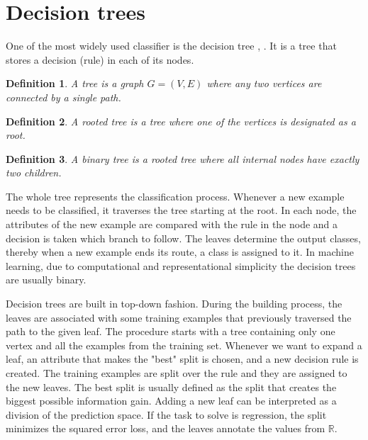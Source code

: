 \documentclass{pracamgr}
\newtheorem{mydef}{Definition}
\begin{document}
\section{Decision trees}
One of the most widely used classifier is the decision tree \citep{quinlan1986induction},
\citep{morgan:1963}.
It is a tree that stores a decision (rule) in each of its nodes.

\begin{mydef}
 A tree is a graph $G = (V, E)$ where any two vertices are connected by a single path.
\end{mydef}

\begin{mydef}
 A rooted tree is a tree where one of the vertices is designated as a root.
\end{mydef}

\begin{mydef}
 A binary tree is a rooted tree where all internal nodes have exactly two children.
\end{mydef}

The whole tree represents the classification
process. Whenever a new example needs to be classified, it traverses the tree starting at the
root. In each node, the attributes of the new example are compared with the rule in the node
and a decision is taken which branch to follow. The leaves determine the output classes, thereby
when a new example ends its route, a class is assigned to it. In machine learning,
due to computational and representational simplicity the decision trees are usually
binary.

Decision trees are built in top-down fashion. During the building process, the leaves are
associated with some training examples that previously traversed the path to the given leaf.
The procedure starts with a tree containing only one vertex and all the examples from the training set.
Whenever we want to expand a leaf, an attribute that makes the "best" split is chosen,
and a new decision rule is created. The training examples are split over the rule and they are
assigned to the new leaves. The best split is usually defined as the split that creates the
biggest possible information gain. Adding a new leaf can 
be interpreted as a division of the prediction space. If the task to solve is regression,
the split minimizes the squared error loss, and the leaves annotate the values from 
$\mathbb{R}$.
\end{document}
